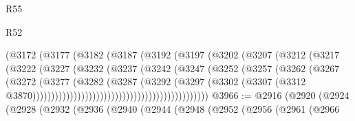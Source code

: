 \begin{lexlean}{R55}
\begin{lexlean}{R52}
\begin{coremodule}
{{{{{{{{{{{{{{{{{{{{{{{{{{{{{{{{{{{{{{{{{{{{{{{{{{{{{{{{{{{{{{{{{{{{{{{{{{{{{{{{{{{{{{{{{{{{{{{{{{{{{{{{{{{{{{{{{{{{{{{{{{{{{{{{{{{{{{{{{{{{{{{{{{{{{{{{{{{{{{{{{{{{{{{{{{{{{{{{{{{{{{{{{{{{{{{{{{{{{{                                        (@3172
                                          (@3177
                                            (@3182
                                              (@3187
                                                (@3192
                                                  (@3197
                                                    (@3202
                                                      (@3207
                                                        (@3212
                                                          (@3217
                                                            (@3222
                                                              (@3227
                                                                (@3232
                                                                  (@3237
                                                                    (@3242
                                                                      (@3247
                                                                        (@3252
                                                                          (@3257
                                                                            (@3262
                                                                              (@3267
                                                                                (@3272
                                                                                  (@3277
                                                                                    (@3282
                                                                                      (@3287
                                                                                        (@3292
                                                                                          (@3297
                                                                                            (@3302
                                                                                              (@3307
                                                                                                (@3312
                                                                                                  @3870)))))))))))))))))))))))))))))))))))))))))))))))
@3966 := @2916
    (@2920
      (@2924
        (@2928
          (@2932
            (@2936
              (@2940
                (@2944
                  (@2948
                    (@2952
                      (@2956
                        (@2961
                          (@2966
}}}}}}}}}}}}}}}}}}}}}}}}}}}}}}}}}}}}}}}}}}}}}}}}}}}}}}}}}}}}}}}}}}}}}}}}}}}}}}}}}}}}}}}}}}}}}}}}}}}}}}}}}}}}}}}}}}}}}}}}}}}}}}}}}}}}}}}}}}}}}}}}}}}}}}}}}}}}}}}}}}}}}}}}}}}}}}}}}}}}}}}}}}}}}}}}}}}}}}
\end{coremodule}
\end{lexlean}
\end{lexlean}
